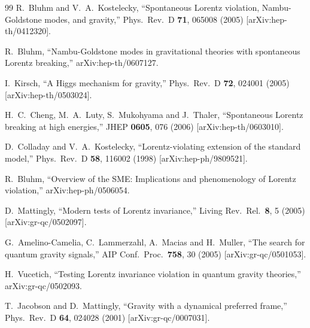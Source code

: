 \begin{thebibliography}{99}
  R.~Bluhm and V.~A.~Kostelecky,
  ``Spontaneous Lorentz violation, Nambu-Goldstone modes, and gravity,''
  Phys.\ Rev.\ D {\bf 71}, 065008 (2005)
  [arXiv:hep-th/0412320].

  R.~Bluhm,
   ``Nambu-Goldstone modes in gravitational theories with spontaneous Lorentz
  breaking,''
  arXiv:hep-th/0607127.

  I.~Kirsch,
  ``A Higgs mechanism for gravity,''
  Phys.\ Rev.\ D {\bf 72}, 024001 (2005)
  [arXiv:hep-th/0503024].

  H.~C.~Cheng, M.~A.~Luty, S.~Mukohyama and J.~Thaler,
  ``Spontaneous Lorentz breaking at high energies,''
  JHEP {\bf 0605}, 076 (2006)
  [arXiv:hep-th/0603010].

  D.~Colladay and V.~A.~Kostelecky,
  ``Lorentz-violating extension of the standard model,''
  Phys.\ Rev.\ D {\bf 58}, 116002 (1998)
  [arXiv:hep-ph/9809521].

  R.~Bluhm,
   ``Overview of the SME: Implications and phenomenology of Lorentz
  violation,''
  arXiv:hep-ph/0506054.

  D.~Mattingly,
  ``Modern tests of Lorentz invariance,''
  Living Rev.\ Rel.\  {\bf 8}, 5 (2005)
  [arXiv:gr-qc/0502097].

  G.~Amelino-Camelia, C.~Lammerzahl, A.~Macias and H.~Muller,
  ``The search for quantum gravity signals,''
  AIP Conf.\ Proc.\  {\bf 758}, 30 (2005)
  [arXiv:gr-qc/0501053].

  H.~Vucetich,
  ``Testing Lorentz invariance violation in quantum gravity theories,''
  arXiv:gr-qc/0502093.

  T.~Jacobson and D.~Mattingly,
  ``Gravity with a dynamical preferred frame,''
  Phys.\ Rev.\ D {\bf 64}, 024028 (2001)
  [arXiv:gr-qc/0007031].


\end{thebibliography}
